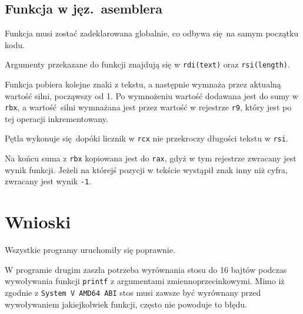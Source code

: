 \documentclass[polish, 11pt]{article}
\begin{document}
	\subsection{Funkcja w jęz.\ asemblera}
		\begin{minipage}{.5\textwidth}
			Funkcja musi zostać zadeklarowana globalnie, co odbywa się na samym początku kodu.

			Argumenty przekazane do funkcji znajdują się w \verb|rdi(text)| oraz \verb|rsi(length)|.
			
			Funkcja pobiera kolejne znaki z tekstu, a następnie wymnaża przez aktualną wartość silni, począwszy od 1.
			Po wymnożeniu wartość dodawana jest do sumy w \verb|rbx|,
			a wartość silni wymnażana jest przez wartość w rejestrze \verb|r9|, który jest po tej operacji inkrementowany.

			Pętla wykonuje się dopóki licznik w \verb|rcx| nie przekroczy długości tekstu w \verb|rsi|.

			Na końcu suma z \verb|rbx| kopiowana jest do \verb|rax|, gdyż w tym rejestrze zwracany jest wynik funkcji.
			Jeżeli na którejś pozycji w tekście wystąpił znak inny niż cyfra, zwracany jest wynik \verb|-1|.
			
			\section{Wnioski}
				Wszystkie programy uruchomiły się poprawnie.
			
				W programie drugim zaszła potrzeba wyrównania stosu do 16 bajtów podczas wywoływania funkcji \verb|printf| z argumentami zmiennoprzecinkowymi.
				Mimo iż zgodnie z \verb|System V AMD64 ABI| stos musi zawsze być wyrównany przed wywoływaniem jakiejkolwiek funkcji, często nie powoduje to błędu.
		\end{minipage}%
		\hspace{1cm}
		\begin{minipage}{.5\textwidth}
			
		\end{minipage}
\end{document}
